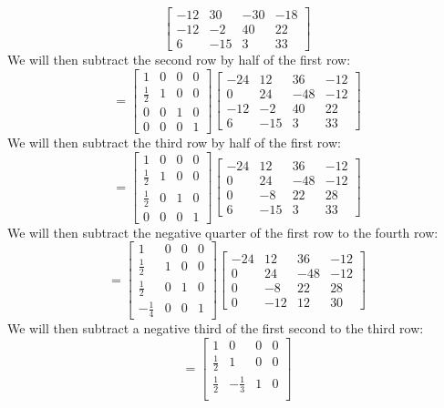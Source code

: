 \documentclass[12pt]{article}
\begin{document}
\begin{adjustwidth}{0em}{0pt}
\[\begin{bmatrix}
-12 & 30 & -30 & -18\\
-12 & -2 & 40 & 22\\
6 & -15 & 3 & 33
\end{bmatrix}\]
We will then subtract the second row by half of the first row:
\[
=
\begin{bmatrix}
1 & 0 & 0 & 0\\
\frac{1}{2} & 1 & 0 & 0\\
0 & 0 & 1 & 0\\
0 & 0 & 0 & 1
\end{bmatrix}
\begin{bmatrix}
-24 & 12 & 36 & -12\\
0 & 24 & -48 & -12\\
-12 & -2 & 40 & 22\\
6 & -15 & 3 & 33
\end{bmatrix}\]
We will then subtract the third row by half of the first row:
\[
=
\begin{bmatrix}
1 & 0 & 0 & 0\\
\frac{1}{2} & 1 & 0 & 0\\
\frac{1}{2} & 0 & 1 & 0\\
0 & 0 & 0 & 1
\end{bmatrix}
\begin{bmatrix}
-24 & 12 & 36 & -12\\
0 & 24 & -48 & -12\\
0 & -8 & 22 & 28\\
6 & -15 & 3 & 33
\end{bmatrix}\]
We will then subtract the negative quarter of the first row to the fourth row:
\[
=
\begin{bmatrix}
1 & 0 & 0 & 0\\
\frac{1}{2} & 1 & 0 & 0\\
\frac{1}{2} & 0 & 1 & 0\\
-\frac{1}{4} & 0 & 0 & 1
\end{bmatrix}
\begin{bmatrix}
-24 & 12 & 36 & -12\\
0 & 24 & -48 & -12\\
0 & -8 & 22 & 28\\
0 & -12 & 12 & 30
\end{bmatrix}\]
We will then subtract a negative third of the first second to the third row:
\[
=
\begin{bmatrix}
1 & 0 & 0 & 0\\
\frac{1}{2} & 1 & 0 & 0\\
\frac{1}{2} & -\frac{1}{3} & 1 & 0\\

\end{bmatrix}\]
\end{adjustwidth}
\end{document}
